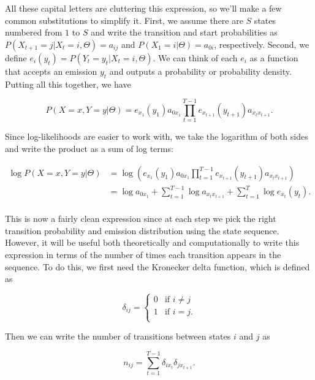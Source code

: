 All these capital letters are cluttering this expression, so we'll make a few common substitutions to simplify it. First, we assume there are $S$ states numbered from $1$ to $S$ and write the transition and start probabilities as $P(X_{t+1}=j|X_t=i, \Theta) = a_{ij}$ and $P(X_1=i|\Theta) = a_{0i}$, respectively. Second, we define $e_i(y_t) = P(Y_t=y_t|X_t=i, \Theta)$. We can think of each $e_i$ as a function that accepts an emission $y_t$ and outputs a probability or probability density. Putting all this together, we have

\begin{equation*}
P(X=x, Y=y|\Theta) = e_{x_1}(y_1)a_{0x_1} \prod_{t=1}^{T-1} e_{x_{t+1}}(y_{t+1}) a_{x_t x_{t+1}}.
\end{equation*}

Since log-likelihoods are easier to work with, we take the logarithm of both sides and write the product as a sum of log terms:

\begin{align*}
\log P(X=x, Y=y|\Theta)
&= \log \left( e_{x_1}(y_1)a_{0x_1} \prod_{t=1}^{T-1} e_{x_{t+1}}(y_{t+1}) a_{x_t x_{t+1}} \right) \\
&= \log a_{0x_1} + \sum_{t=1}^{T-1} \log a_{x_t x_{t+1}} + \sum_{t=1}^T \log e_{x_t}(y_t). \\
\end{align*}

This is now a fairly clean expression since at each step we pick the right transition probability and emission distribution using the state sequence. However, it will be useful both theoretically and computationally to write this expression in terms of the number of times each transition appears in the sequence. To do this, we first need the Kronecker delta function, which is defined as

\begin{equation*}
\delta_{ij} =
\begin{cases}
    0 &\text{if } i \neq j \\
    1 &\text{if } i=j. \\
\end{cases}
\end{equation*}

Then we can write the number of transitions between states $i$ and $j$ as

\begin{equation*}
n_{ij} = \sum_{t=1}^{T-1} \delta_{ix_t} \delta_{jx_{t+1}}.
\end{equation*}

